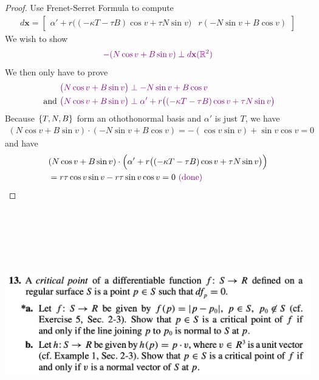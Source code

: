 \documentclass{report}
\begin{document}
\begin{proof}
Use Frenet-Serret Formula to compute 
\begin{align*}
d\textbf{x}= \begin{bmatrix}
  \alpha '+r \big((-\kappa T-\tau B)\cos v+ \tau N \sin v \big) & r(-N \sin v+ B \cos v)
\end{bmatrix}
\end{align*}
We wish to show 
\begin{align*}
  \textcolor{violet}{-(N \cos v+B \sin v)\perp d\textbf{x}(\mathbb{R}^2)}
\end{align*}
We then only have to prove 
\begin{align*}
&\textcolor{violet}{\big(N \cos v+B \sin v \big)\perp -N \sin v + B \cos v} \\
  \text{ and }&\textcolor{violet}{\big(N \cos v+B \sin v \big) \perp \alpha' + r  \big((-\kappa T-\tau B)\cos v+ \tau N \sin v \big)}
\end{align*}
Because $\{ T,N,B \}$ form an othothonormal basis and $\alpha '$ is just $T$, we have 
\begin{align*}
  (N \cos v + B \sin v)\cdot (-N \sin v+ B \cos v)=-(\cos v \sin v)+\sin v \cos v=0
\end{align*}
and have 
\begin{align*}
  &(N \cos v + B \sin v)\cdot \Big(\alpha '+r\big((-\kappa T-\tau B)\cos v + \tau N \sin v \big) \Big)\\
  &= r\tau \cos v \sin v- r \tau \sin v \cos v=0 \textcolor{violet}{\text{ (done) }}
\end{align*}
\end{proof}
\begin{question}{}{}
\includegraphics[height=10cm,width=18cm]{hw4q4}
\end{question}
\end{document}

